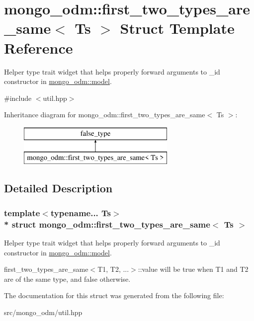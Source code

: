 \hypertarget{structmongo__odm_1_1first__two__types__are__same}{}\section{mongo\+\_\+odm\+:\+:first\+\_\+two\+\_\+types\+\_\+are\+\_\+same$<$ Ts $>$ Struct Template Reference}
\label{structmongo__odm_1_1first__two__types__are__same}


Helper type trait widget that helps properly forward arguments to \+\_\+id constructor in \hyperlink{classmongo__odm_1_1model}{mongo\+\_\+odm\+::model}.  




{\ttfamily \#include $<$util.\+hpp$>$}

Inheritance diagram for mongo\+\_\+odm\+:\+:first\+\_\+two\+\_\+types\+\_\+are\+\_\+same$<$ Ts $>$\+:\begin{figure}[H]
\begin{center}
\leavevmode
\includegraphics[height=2.000000cm]{structmongo__odm_1_1first__two__types__are__same}
\end{center}
\end{figure}


\subsection{Detailed Description}
\subsubsection*{template$<$typename... Ts$>$\\*
struct mongo\+\_\+odm\+::first\+\_\+two\+\_\+types\+\_\+are\+\_\+same$<$ Ts $>$}

Helper type trait widget that helps properly forward arguments to \+\_\+id constructor in \hyperlink{classmongo__odm_1_1model}{mongo\+\_\+odm\+::model}. 

first\+\_\+two\+\_\+types\+\_\+are\+\_\+same$<$\+T1, T2, ...$>$\+::value will be true when T1 and T2 are of the same type, and false otherwise. 

The documentation for this struct was generated from the following file\+:\begin{DoxyCompactItemize}
\item 
src/mongo\+\_\+odm/util.\+hpp\end{DoxyCompactItemize}
